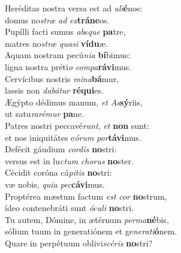 \evenverse Heréditas nostra versa est ad \textit{a}\textit{li}\textbf{é}nos:~\*\\
\evenverse domus no\textit{stræ} \textit{ad} \textit{ex}\textbf{trá}\textbf{ne}os.\\
\oddverse Pupílli facti sumus \textit{ab}s\textit{que} \textbf{pa}tre,~\*\\
\oddverse matres no\textit{stræ} \textit{qua}\textit{si} \textbf{ví}\textbf{du}æ.\\
\evenverse Aquam nostram pecú\textit{ni}\textit{a} \textbf{bí}bimus:~\*\\
\evenverse ligna nostra préti\textit{o} \textit{com}\textit{pa}\textbf{rá}\textbf{vi}mus.\\
\oddverse Cervícibus nostris \textit{mi}\textit{na}\textbf{bá}mur,~\*\\
\oddverse lassis non \textit{da}\textit{bá}\textit{tur} \textbf{ré}\textbf{qui}es.\\
\evenverse Ægýpto dédimus manum, \textit{et} \textit{As}\textbf{sý}riis,~\*\\
\evenverse ut satu\textit{ra}\textit{ré}\textit{mur} \textbf{pa}ne.\\
\oddverse Patres nostri peccavé\textit{runt}, \textit{et} \textbf{non} sunt:~\*\\
\oddverse et nos iniquitátes e\textit{ó}\textit{rum} \textit{por}\textbf{tá}\textbf{vi}mus.\\
\evenverse Defécit gáudium \textit{cor}\textit{dis} \textbf{no}stri:~\*\\
\evenverse versus est in lu\textit{ctum} \textit{cho}\textit{rus} \textbf{no}ster.\\
\oddverse Cécidit coróna cá\textit{pi}\textit{tis} \textbf{no}stri:~\*\\
\oddverse væ nobis, \textit{qui}\textit{a} \textit{pec}\textbf{cá}\textbf{vi}mus.\\
\evenverse Proptérea mæstum factum \textit{est} \textit{cor} \textbf{no}strum,~\*\\
\evenverse ídeo contenebráti sunt \textit{ó}\textit{cu}\textit{li} \textbf{no}stri.\\
\oddverse Tu autem, Dómine, in ætérnum \textit{per}\textit{ma}\textbf{né}bis,~\*\\
\oddverse sólium tuum in generatiónem et ge\textit{ne}\textit{ra}\textit{ti}\textbf{ó}nem.\\
\evenverse Quare in perpétuum oblivi\textit{scé}\textit{ris} \textbf{no}stri?~\*\\
